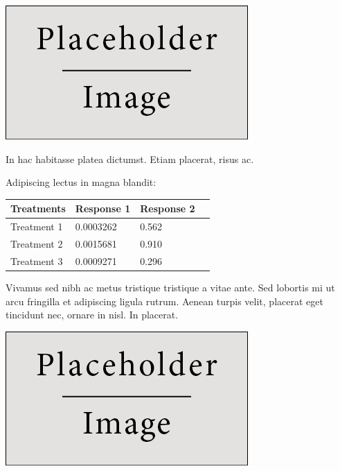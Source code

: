 \documentclass[a0,landscape]{a0poster}
\begin{document}
\begin{multicols}{4}
\begin{center}\vspace{1cm}
\includegraphics[width=0.8\linewidth]{placeholder}
\end{center}\vspace{1cm}

In hac habitasse platea dictumst. Etiam placerat, risus ac.

Adipiscing lectus in magna blandit:

\begin{center}\vspace{1cm}
\begin{tabular}{l l l l}
\toprule
\textbf{Treatments} & \textbf{Response 1} & \textbf{Response 2} \\
\midrule
Treatment 1 & 0.0003262 & 0.562 \\
Treatment 2 & 0.0015681 & 0.910 \\
Treatment 3 & 0.0009271 & 0.296 \\
\bottomrule
\end{tabular}
\end{center}\vspace{1cm}

Vivamus sed nibh ac metus tristique tristique a vitae ante. Sed lobortis mi ut arcu fringilla et adipiscing ligula rutrum. Aenean turpis velit, placerat eget tincidunt nec, ornare in nisl. In placerat.

\begin{center}\vspace{1cm}
\includegraphics[width=0.8\linewidth]{placeholder}
\end{center}\vspace{1cm}


\end{multicols}
\end{document}
